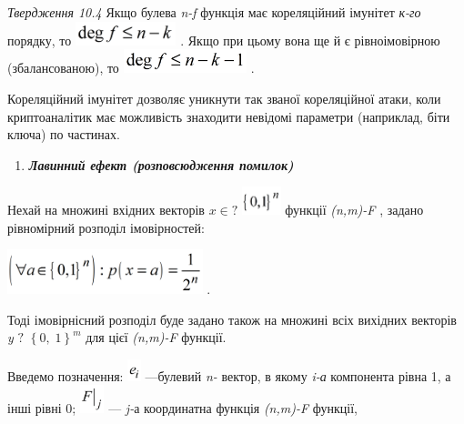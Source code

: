 \textit{Твердження 10.4}\textit{  }Якщо булева \textit{n}\textit{{}-}\textit{f} 
функція  має кореляційний імунітет \textit{к-го }порядку, то 
\includegraphics[width=1.1535in,height=0.272in]{crypt-img/crypt-img223.png} .
Якщо при цьому вона ще й  є рівноімовірною (збалансованою), то 
\includegraphics[width=1.4134in,height=0.272in]{crypt-img/crypt-img224.png} .

Кореляційний імунітет дозволяє уникнути так званої кореляційної атаки, коли
криптоаналітик має можливість знаходити невідомі параметри (наприклад, біти
ключа) по частинах.


\bigskip

\liststyleWWviiiNumxxix
\setcounter{saveenum}{\value{enumi}}
\begin{enumerate}
\setcounter{enumi}{\value{saveenum}}
\item {\bfseries\itshape
Лавинний ефект (розповсюдження помилок)}
\end{enumerate}
Нехай на множині  вхідних векторів  ${x\in ?}$
\includegraphics[width=0.4437in,height=0.3193in]{crypt-img/crypt-img225.png} 
функції \textit{(}\textit{n}\textit{,}\textit{m}\textit{)-}\textit{F} , задано
рівномірний розподіл імовірностей:

{\centering
 \includegraphics[width=2.2354in,height=0.5091in]{crypt-img/crypt-img226.png} .
\par}

Тоді імовірнісний розподіл буде задано також на множині всіх вихідних векторів
\textit{y} ${?}$ ${\left\{0,\;1\right\}^{{m}}}$ для цієї 
\textit{(}\textit{n}\textit{,}\textit{m}\textit{)-}\textit{F}  функції.

Введемо позначення: 
\includegraphics[width=0.1528in,height=0.25in]{crypt-img/crypt-img227.png} 
---булевий \textit{n}\textit{{}-} вектор, в якому \textit{i-а }компонента рівна
1, а інші рівні 0; 
\includegraphics[width=0.278in,height=0.3193in]{crypt-img/crypt-img228.png}  ---
\textit{j-}а\textit{ }координатна функція
\textit{(}\textit{n}\textit{,}\textit{m}\textit{)-}\textit{F}  функції,

